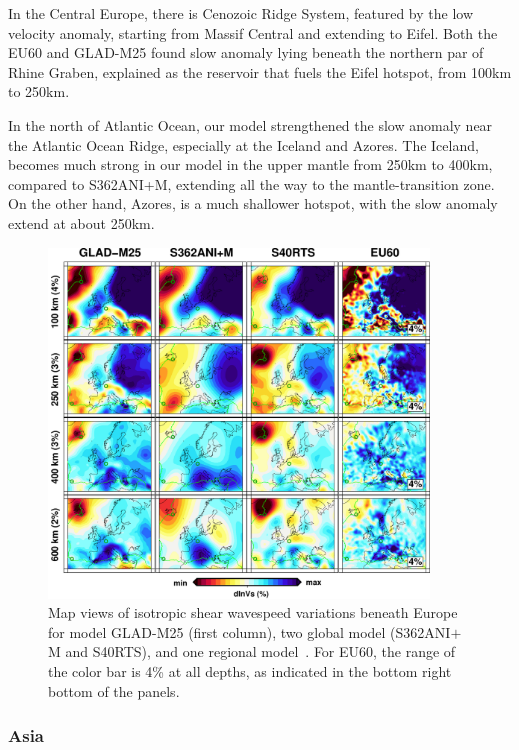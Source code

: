 \documentclass[extra,mreferee]{gji}
\begin{document}
In the Central Europe, there is Cenozoic Ridge System, featured by the low velocity
anomaly, starting from Massif Central and extending to Eifel. Both the EU60 and
GLAD-M25 found slow anomaly lying beneath the northern par of Rhine Graben, explained
as the reservoir that fuels the Eifel hotspot, from 100km to 250km.

In the north of Atlantic Ocean, our model strengthened the slow anomaly near the
Atlantic Ocean Ridge, especially at the Iceland and Azores. The Iceland, becomes
much strong in our model in the upper mantle from 250km to 400km, compared to
S362ANI+M, extending all the way to the mantle-transition zone. On the other hand,
Azores, is a much shallower hotspot, with the slow anomaly extend at about 250km.

\begin{figure}
\includegraphics[width=0.9\textwidth]{figures/depth_slice/europe_vs.pdf}
  \caption{Map views of isotropic shear wavespeed variations beneath Europe for   
  model GLAD-M25 (first column), two global model (S362ANI$+$M and S40RTS), and
  one regional model~\citep[EU60;][]{zhu2015seismic}. For EU60, the range of the color
  bar is 4\% at all depths, as indicated in the bottom right bottom of the panels.}
\label{fig:europe-vs}
\centering
\end{figure}

\subsubsection{Asia}
\end{document}
